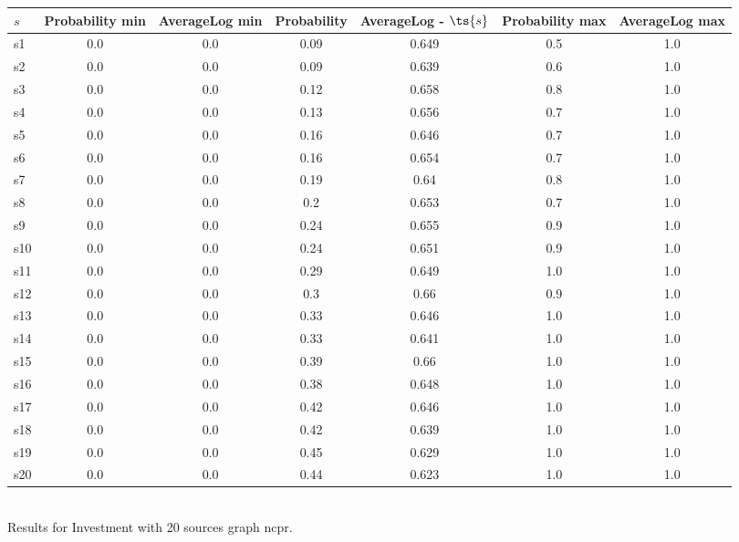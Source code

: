 \documentclass{article}
\begin{document}
\noindent\begin{tabular}{|l|c|c|c|c|c|c|}
\hline
$s$& Probability min & AverageLog min & Probability & AverageLog - $\ts{s}$ & Probability max & AverageLog max\\
\hline
s1 &0.0 & 0.0 & 0.09 & 0.649 & 0.5 & 1.0\\
\hline
s2 &0.0 & 0.0 & 0.09 & 0.639 & 0.6 & 1.0\\
\hline
s3 &0.0 & 0.0 & 0.12 & 0.658 & 0.8 & 1.0\\
\hline
s4 &0.0 & 0.0 & 0.13 & 0.656 & 0.7 & 1.0\\
\hline
s5 &0.0 & 0.0 & 0.16 & 0.646 & 0.7 & 1.0\\
\hline
s6 &0.0 & 0.0 & 0.16 & 0.654 & 0.7 & 1.0\\
\hline
s7 &0.0 & 0.0 & 0.19 & 0.64 & 0.8 & 1.0\\
\hline
s8 &0.0 & 0.0 & 0.2 & 0.653 & 0.7 & 1.0\\
\hline
s9 &0.0 & 0.0 & 0.24 & 0.655 & 0.9 & 1.0\\
\hline
s10 &0.0 & 0.0 & 0.24 & 0.651 & 0.9 & 1.0\\
\hline
s11 &0.0 & 0.0 & 0.29 & 0.649 & 1.0 & 1.0\\
\hline
s12 &0.0 & 0.0 & 0.3 & 0.66 & 0.9 & 1.0\\
\hline
s13 &0.0 & 0.0 & 0.33 & 0.646 & 1.0 & 1.0\\
\hline
s14 &0.0 & 0.0 & 0.33 & 0.641 & 1.0 & 1.0\\
\hline
s15 &0.0 & 0.0 & 0.39 & 0.66 & 1.0 & 1.0\\
\hline
s16 &0.0 & 0.0 & 0.38 & 0.648 & 1.0 & 1.0\\
\hline
s17 &0.0 & 0.0 & 0.42 & 0.646 & 1.0 & 1.0\\
\hline
s18 &0.0 & 0.0 & 0.42 & 0.639 & 1.0 & 1.0\\
\hline
s19 &0.0 & 0.0 & 0.45 & 0.629 & 1.0 & 1.0\\
\hline
s20 &0.0 & 0.0 & 0.44 & 0.623 & 1.0 & 1.0\\
\hline
\end{tabular}\\

\noindent Results for Investment with 20 sources graph ncpr.
\end{document}
